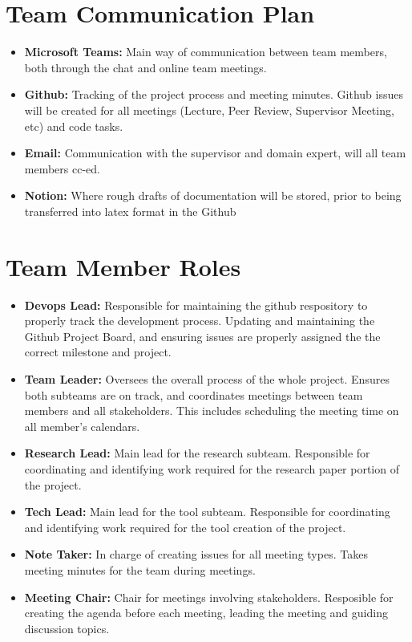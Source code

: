 \documentclass{article}
\begin{document}
  \section{Team Communication Plan}
\begin{itemize}
  \item \textbf{Microsoft Teams:} Main way of communication between team members, both through the chat and online team meetings.
  \item \textbf{Github:} Tracking of the project process and meeting minutes. Github issues will be created for all meetings (Lecture, Peer Review, Supervisor Meeting, etc) and code tasks.
  \item \textbf{Email:} Communication with the supervisor and domain expert, will all team members cc-ed.
  \item \textbf{Notion:} Where rough drafts of documentation will be stored, prior to being transferred into latex format in the Github
\end{itemize}
\section{Team Member Roles}
\begin{itemize}
  \item \textbf{Devops Lead:} Responsible for maintaining the github respository to properly track the development process. Updating and maintaining the Github Project Board, and ensuring issues are properly assigned the the correct milestone and project.
  \item \textbf{Team Leader:} Oversees the overall process of the whole project. Ensures both subteams are on track, and coordinates meetings between team members and all stakeholders. This includes scheduling the meeting time on all member's calendars.
  \item \textbf{Research Lead:} Main lead for the research subteam. Responsible for coordinating and identifying work required for the research paper portion of the project.
  \item \textbf{Tech Lead:} Main lead for the tool subteam. Responsible for coordinating and identifying work required for the tool creation of the project.
  \item \textbf{Note Taker:} In charge of creating issues for all meeting types. Takes meeting minutes for the team during meetings.
  \item \textbf{Meeting Chair:} Chair for meetings involving stakeholders. Resposible for creating the agenda before each meeting, leading the meeting and guiding discussion topics.
\end{itemize}
\end{document}
